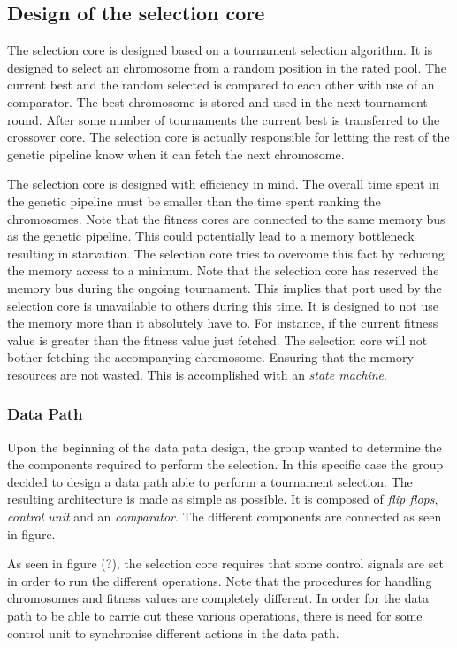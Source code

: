 \subsection {Design of the selection core} \label{fpga:selection:ss:selection_core}

The selection core is designed based on a tournament selection algorithm. It is designed to select an chromosome from a random position in the rated pool. The current best and the random selected is compared to each other with use of an comparator. The best chromosome is stored and used in the next tournament round. After some number of tournaments the current best is transferred to the crossover core. The selection core is actually responsible for letting the rest of the genetic pipeline know when it can fetch the next chromosome. 

The selection core is designed with efficiency in mind. The overall time spent in the genetic pipeline must be smaller than the time spent ranking the chromosomes. Note that the fitness cores are connected to the same memory bus as the genetic pipeline. This could potentially lead to a memory bottleneck resulting in starvation. The selection core tries to overcome this fact by reducing the memory access to a minimum. Note that the selection core has reserved the memory bus during the ongoing tournament. This implies that port used by the selection core is unavailable to others during this time. It is designed to not use the memory more than it absolutely have to. For instance, if the current fitness value is greater than the fitness value just fetched. The selection core will not bother fetching the accompanying chromosome. Ensuring that the memory resources are not wasted. This is accomplished with an \emph{state machine}. 



\subsubsection{Data Path}
Upon the beginning of the data path design, the group wanted to determine the the components required to perform the selection. In this specific case the group decided to design a data path able to perform a tournament selection. The resulting architecture is made as simple as possible.  It is composed of \emph{flip flops}, \emph{control unit} and an \emph{comparator}. The different components are connected as seen in figure.

As seen in figure (?), the selection core requires that some control signals are set in order to run the different operations. Note that the procedures for handling chromosomes and fitness values are completely different. In order for the data path to be able to carrie out these various operations, there is need for some control unit to synchronise different actions in the data path. 



